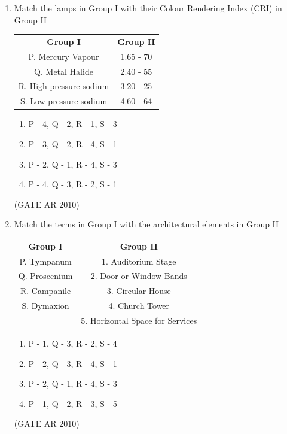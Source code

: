 \documentclass[journal]{IEEEtran}
\begin{document}
\begin{enumerate}
\item Match the lamps in Group I with their Colour Rendering Index (CRI) in Group II

\begin{table}[H]
\centering
\begin{tabular}{cc}
\textbf{Group I} & \textbf{Group II} \\
P. Mercury Vapour & 1.65 - 70 \\
Q. Metal Halide & 2.40 - 55 \\
R. High-pressure sodium & 3.20 - 25 \\
S. Low-pressure sodium & 4.60 - 64 \\
\end{tabular}
\end{table}

\begin{multicols}{2}
\begin{enumerate}
\item P - 4, Q - 2, R - 1, S - 3
\item P - 3, Q - 2, R - 4, S - 1
\item P - 2, Q - 1, R - 4, S - 3
\item P - 4, Q - 3, R - 2, S - 1
\end{enumerate}
\end{multicols}
\hfill (GATE AR 2010)

\item Match the terms in Group I with the architectural elements in Group II

\begin{table}[H]
\centering
\begin{tabular}{cc}
\textbf{Group I} & \textbf{Group II} \\
P. Tympanum & 1. Auditorium Stage \\
Q. Proscenium & 2. Door or Window Bands \\
R. Campanile & 3. Circular House \\
S. Dymaxion & 4. Church Tower \\
& 5. Horizontal Space for Services \\
\end{tabular}
\end{table}

\begin{multicols}{2}
\begin{enumerate}
\item P - 1, Q - 3, R - 2, S - 4
\item P - 2, Q - 3, R - 4, S - 1
\item P - 2, Q - 1, R - 4, S - 3
\item P - 1, Q - 2, R - 3, S - 5
\end{enumerate}
\end{multicols}
\hfill (GATE AR 2010)


\end{enumerate}
\end{document}
